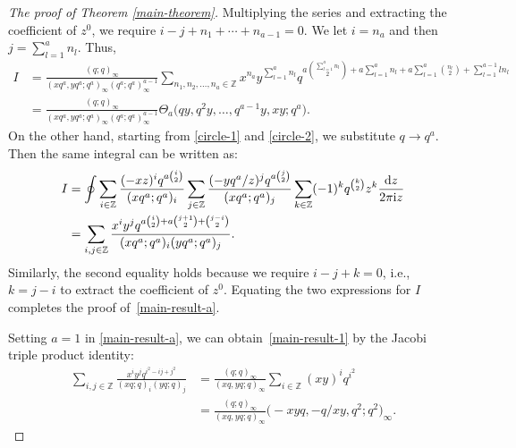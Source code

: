 \documentclass[10pt,a4paper]{amsart}
\numberwithin{equation}{section}
\theoremstyle{definition}
\begin{document}
\begin{proof}[The proof of Theorem \ref{main-theorem}]
Multiplying the series and extracting the coefficient of $z^0$, we require $i-j+n_1+\cdots+n_{a-1}=0$. We let $i=n_a$ and then $j=\sum_{l=1}^an_l$. Thus,
\begin{align*}
I&=\frac{(q;q)_{\infty}}{(xq^a,yq^a;q^a)_{\infty}(q^a;q^a)^{a-1}_{\infty}} \!\sum_{n_1,n_2,\dots,n_a\in\mathbb{Z}}\!\!\!\! x^{n_a}y^{\sum_{l=1}^an_l}q^{a\binom{\sum_{l=1}^an_l}{2}+a\sum_{l=1}^an_l+a\sum_{l=1}^{a}\binom{n_l}{2}+\sum_{l=1}^{a-1}ln_l}\\
&=\frac{(q;q)_{\infty}}{(xq^a,yq^a;q^a)_{\infty}(q^a;q^a)_{\infty}^{a-1}}\Theta_a\bigl(qy,q^2y,\dots,q^{a-1}y,xy;q^a\bigr).
\end{align*}
On the other hand, starting from \eqref{circle-1} and \eqref{circle-2}, we substitute $q\rightarrow q^a$. Then the same integral can be written as:
\begin{align*}
I&=\oint\sum_{i\in\mathbb{Z}}\frac{(-xz)^iq^{a\binom{i}{2}}}{(xq^a;q^a)_i}\sum_{j\in\mathbb{Z}} \frac{(-yq^a/z)^jq^{a\binom{j}{2}}}{(xq^a;q^a)_j}\sum_{k\in\mathbb{Z}}(-1)^kq^{\binom{k}{2}}z^k\frac{{\rm d}z}{2\pi {\rm i}z}\\
&=\sum_{i,j\in \mathbb{Z}}\frac{x^iy^jq^{a\binom{i}{2}+a\binom{j+1}{2}+\binom{j-i}{2}}}{(xq^a;q^a)_i(yq^a;q^a)_j}.
\end{align*}
Similarly, the second equality holds because we require $i-j+k=0$, i.e., $k=j-i$ to extract the coefficient of $z^0$. Equating the two expressions for $I$ completes the proof of~\eqref{main-result-a}.

Setting $a=1$ in \eqref{main-result-a}, we can obtain~\eqref{main-result-1} by the Jacobi triple product identity:
\begin{align*}
 \sum_{i,j \in \mathbb{Z}} \frac{x^i y^j q^{i^2 - ij + j^2}}{(xq; q)_i (yq; q)_j}
 & =\frac{(q;q)_\infty}{(xq,yq;q)_\infty}\sum_{i\in \mathbb{Z}}(xy)^iq^{i^2} \\
 & =\frac{(q;q)_\infty}{(xq,yq;q)_\infty}\bigl(-xyq,-q/xy,q^2;q^2\bigr)_\infty.
\end{align*}


\end{proof}
\end{document}

